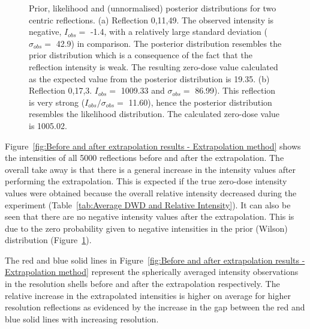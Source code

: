 \begin{figure}
\begin{subfigure}[b]{0.94\textwidth}
        \end{subfigure}
        \caption{Prior, likelihood and (unnormalised) posterior distributions for two centric reflections.
		(a) Reflection 0,11,49. The observed intensity is negative, $I_{obs} =$ -1.4, with a relatively large standard deviation ($\sigma_{obs} =$ 42.9) in comparison.
		The posterior distribution resembles the prior distribution which is a consequence of the fact that the reflection intensity is weak.
		The resulting zero-dose value calculated as the expected value from the posterior distribution is 19.35.
		(b) Reflection 0,17,3. $I_{obs} =$ 1009.33 and $\sigma_{obs} =$ 86.99).
		This reflection is very strong ($I_{obs}/\sigma_{obs}  =$ 11.60), hence the posterior distribution resembles the likelihood distribution.
		The calculated zero-dose value is 1005.02.}
        \label{fig:Probabilistic distributions - Extrapolation method}
\end{figure}

Figure~\ref{fig:Before and after extrapolation results - Extrapolation method}  shows the intensities of all 5000 reflections before and after the extrapolation.
The overall take away is that there is a general increase in the intensity values after performing the extrapolation.
This is expected if the true zero-dose intensity values were obtained because the overall relative intensity decreased during the experiment (Table~\ref{tab:Average DWD and Relative Intensity}).
It can also be seen that there are no negative intensity values after the extrapolation.
This is due to the zero probability given to negative intensities in the prior (Wilson) distribution (Figure~\ref{fig:Probabilistic distributions - Extrapolation method}).

The red and blue solid lines in Figure~\ref{fig:Before and after extrapolation results - Extrapolation method} represent the spherically averaged intensity observations in the resolution shells before and after the extrapolation respectively.
The relative increase in the extrapolated intensities is higher on average for higher resolution reflections as evidenced by the increase in the gap between the red and blue solid lines with increasing resolution.

